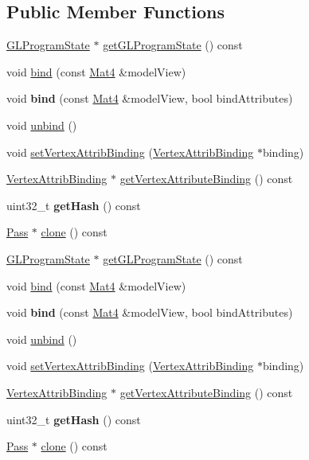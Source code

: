 \subsection*{Public Member Functions}
\begin{DoxyCompactItemize}
\item 
\hyperlink{classGLProgramState}{G\+L\+Program\+State} $\ast$ \hyperlink{classPass_aa052a30abf863d4e2f3af070cba3d9b2}{get\+G\+L\+Program\+State} () const
\item 
void \hyperlink{classPass_a61f3c6e7b46c51555c43d97619a13630}{bind} (const \hyperlink{classMat4}{Mat4} \&model\+View)
\item 
\mbox{\label{classPass_a3b0f14c9a713a1af7fddb61c7364b000}} 
void {\bfseries bind} (const \hyperlink{classMat4}{Mat4} \&model\+View, bool bind\+Attributes)
\item 
void \hyperlink{classPass_a50df7eb7f9ce52d7c93ca5073f675f32}{unbind} ()
\item 
void \hyperlink{classPass_a611219b345c8a97b89d13fa1589fe87c}{set\+Vertex\+Attrib\+Binding} (\hyperlink{classVertexAttribBinding}{Vertex\+Attrib\+Binding} $\ast$binding)
\item 
\hyperlink{classVertexAttribBinding}{Vertex\+Attrib\+Binding} $\ast$ \hyperlink{classPass_a60893bb19b8e68ad0b5d8139aaf10202}{get\+Vertex\+Attribute\+Binding} () const
\item 
\mbox{\label{classPass_a891fc12b1bc9c8dab115f7c578726519}} 
uint32\+\_\+t {\bfseries get\+Hash} () const
\item 
\hyperlink{classPass}{Pass} $\ast$ \hyperlink{classPass_a4689b5cd4c248317f617934a9476cd10}{clone} () const
\item 
\hyperlink{classGLProgramState}{G\+L\+Program\+State} $\ast$ \hyperlink{classPass_ab1fd602c33cc2ac73585f578e8a22412}{get\+G\+L\+Program\+State} () const
\item 
void \hyperlink{classPass_a61f3c6e7b46c51555c43d97619a13630}{bind} (const \hyperlink{classMat4}{Mat4} \&model\+View)
\item 
\mbox{\label{classPass_a3b0f14c9a713a1af7fddb61c7364b000}} 
void {\bfseries bind} (const \hyperlink{classMat4}{Mat4} \&model\+View, bool bind\+Attributes)
\item 
void \hyperlink{classPass_a50df7eb7f9ce52d7c93ca5073f675f32}{unbind} ()
\item 
void \hyperlink{classPass_a611219b345c8a97b89d13fa1589fe87c}{set\+Vertex\+Attrib\+Binding} (\hyperlink{classVertexAttribBinding}{Vertex\+Attrib\+Binding} $\ast$binding)
\item 
\hyperlink{classVertexAttribBinding}{Vertex\+Attrib\+Binding} $\ast$ \hyperlink{classPass_a7fec50d8717f63c4e1520d2edee2e789}{get\+Vertex\+Attribute\+Binding} () const
\item 
\mbox{\label{classPass_a891fc12b1bc9c8dab115f7c578726519}} 
uint32\+\_\+t {\bfseries get\+Hash} () const
\item 
\hyperlink{classPass}{Pass} $\ast$ \hyperlink{classPass_afb85f28bbbbf322d85708ce8d69ae2bb}{clone} () const
\end{DoxyCompactItemize}
